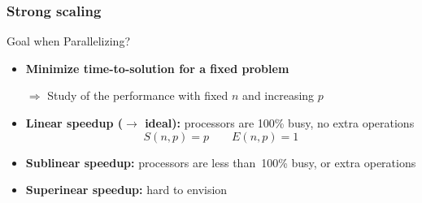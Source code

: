 \documentclass[xcolor={x11names,svgnames,psnames}]{beamer}
\begin{document}
\begin{frame}
\frametitle{Strong scaling}

\begin{alertblock}{Goal when Parallelizing?}
  \begin{itemize}
  \item \textbf{Minimize time-to-solution for a fixed problem}
  \item[$\Rightarrow$] Study of the performance with fixed $n$ and increasing $p$
  \end{itemize}
\end{alertblock}

\medskip

\begin{itemize} 
\item  \textbf{Linear speedup ($\rightarrow$ ideal):} 
processors are 100\% busy, no extra operations
\[
  S(n,p)  = p \qquad E(n,p)  = 1
\]

\medskip

\item \textbf{Sublinear speedup:}
processors are less than~100\% busy, or extra operations 

\medskip

\item {\bf Superinear speedup:} hard to envision 


\end{itemize}
\end{frame}
\end{document}
